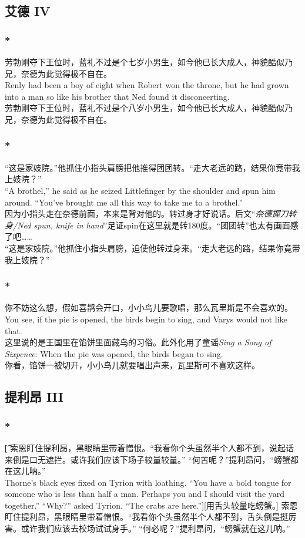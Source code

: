 \documentclass[12pt,a4paper]{article}
\newcommand{\h}[1]{{\color{red}#1}\\}
\newcommand{\la}[1]{{\color{blue}#1}\\}
\begin{document}
\subsection{艾德 IV}
\subsubsection{\color{red}*}\la{
劳勃刚夺下王位时，蓝礼不过是个七岁小男生，如今他已长大成人，神貌酷似乃兄，奈德为此觉得极不自在。\\
Renly had been a boy of eight when Robert won the throne, but he had grown into a man so like his brother that Ned found it disconcerting.}
劳勃刚夺下王位时，蓝礼不过是个八岁小男生，如今他已长大成人，神貌酷似乃兄，奈德为此觉得极不自在。


\subsubsection{\color{red}*}\la{
	“这是家妓院。”他抓住小指头肩膀把他推得团团转。“走大老远的路，结果你竟带我上妓院？”\\
	“A brothel,” he said as he seized Littlefinger by the shoulder and spun him around. “You've brought me all this way to take me to a brothel.”}\h{
	因为小指头走在奈德前面，本来是背对他的。转过身才好说话。后文“\emph{奈德握刀转身/Ned spun, knife in hand}”足证spin在这里就是转180度。“团团转”也太有画面感了吧……}
	“这是家妓院。”他抓住小指头肩膀，迫使他转过身来。“走大老远的路，结果你竟带我上妓院？”
	
\subsubsection{\color{red}*}\la{
	你不妨这么想，假如喜鹊会开口，小小鸟儿要歌唱，那么瓦里斯是不会喜欢的。\\
	You see, if the pie is opened, the birds begin to sing, and Varys would not like that.}\h{
	这里说的是王国里在馅饼里面藏鸟的习俗。此外化用了童谣\emph{Sing a Song of Sixpence}: When the pie was opened, the birds began to sing.}
	你看，馅饼一被切开，小小鸟儿就要唱出声来，瓦里斯可不喜欢这样。
	
			
\subsection{提利昂 III}
\subsubsection{\color{red}*}\t[
	索恩盯住提利昂，黑眼睛里带着憎恨。“我看你个头虽然半个人都不到，说起话来倒是口无遮拦。或许我们应该下场子较量较量。”
	“何苦呢？”提利昂问，“螃蟹都在这儿呐。”\\
	Thorne's black eyes fixed on Tyrion with loathing. “You have a bold tongue for someone who is less than half a man. Perhaps you and I should visit the yard together.”
	“Why?” asked Tyrion. “The crabs are here.”][用舌头较量吃螃蟹。]
	索恩盯住提利昂，黑眼睛里带着憎恨。“我看你个头虽然半个人都不到，舌头倒是挺厉害。或许我们应该去校场试试身手。”
	“何必呢？”提利昂问，“螃蟹就在这儿呐。”
	
\end{document}
